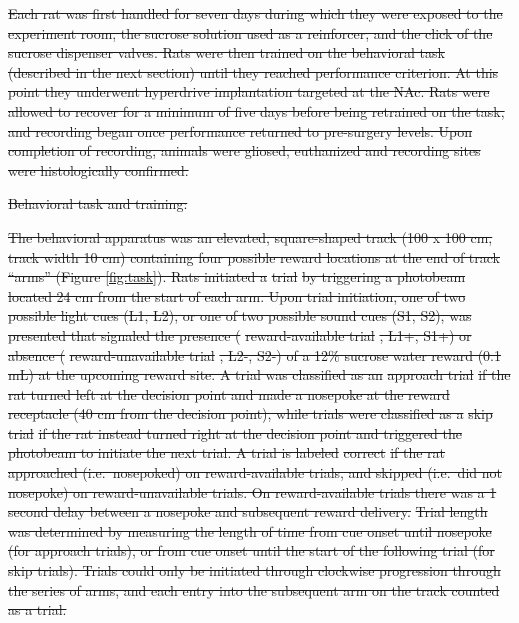 \documentclass[11pt]{article}
\providecommand{\DIFdel}[1]{{\protect\color{red}\sout{#1}}}                      %
\begin{document}
\DIFdel{Each rat was first handled for seven days during which they were
exposed to the experiment room, the sucrose solution used as a
reinforcer, and the click of the sucrose dispenser valves. Rats were
then trained on the behavioral task (described in the next section)
until they reached performance criterion. At this point they
underwent hyperdrive implantation targeted at the NAc. Rats were
allowed to recover for a minimum of five days before being retrained
on the task, and recording began once performance returned to
pre-surgery levels. Upon completion of recording, animals were gliosed,
euthanized and recording sites were histologically confirmed.
}%

\DIFdel{Behavioral task and training:}%

\DIFdel{The behavioral apparatus was an elevated, square-shaped track (100 x
100 cm, track width 10 cm) containing four possible reward locations
at the end of track ``arms'' (Figure \ref{fig:task}). Rats initiated a
}%
\DIFdel{trial}%
\DIFdel{by triggering a photobeam located 24 cm from the start of
each arm. Upon trial initiation, one of two possible light cues (L1,
L2), or one of two possible sound cues (S1, S2), was presented that
signaled the presence (}%
\DIFdel{reward-available trial}%
\DIFdel{, L1+, S1+) or
absence (}%
\DIFdel{reward-unavailable trial}%
\DIFdel{, L2-, S2-) of a 12\% sucrose
water reward (0.1 mL) at the upcoming reward site. A trial was
classified as an }%
\DIFdel{approach trial}%
\DIFdel{if the rat turned left at the
decision point and made a nosepoke at the reward receptacle (40 cm
from the decision point), while trials were classified as a }%
\DIFdel{skip
trial}%
\DIFdel{if the rat instead turned right at the decision point and
triggered the photobeam to initiate the next trial. A trial is labeled
}%
\DIFdel{correct}%
\DIFdel{if the rat approached (i.e.\ nosepoked) on
reward-available trials, and skipped (i.e.\ did not nosepoke) on
reward-unavailable trials. On reward-available trials there was a 1
second delay between a nosepoke and subsequent reward delivery. }%
\DIFdel{Trial length}%
\DIFdel{was determined by measuring the length of time from
cue onset until nosepoke (for approach trials), or from cue onset
until the start of the following trial (for skip trials). Trials could
only be initiated through clockwise progression through the series of
arms, and each entry into the subsequent arm on the track counted as a
trial.
}%
\end{document}
